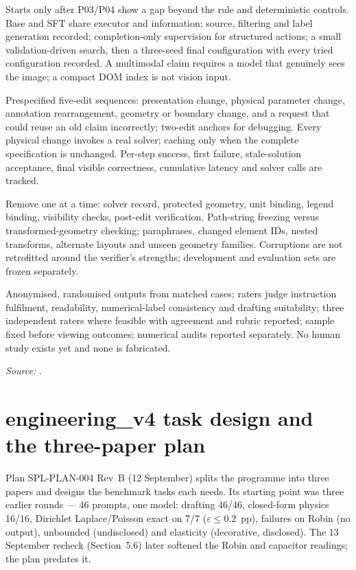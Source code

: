 \documentclass[11pt,a4paper]{article}
\newcommand{\code}[1]{\path{#1}}
\begin{document}
\begin{description}[style=nextline]
  \item[P05 training study.] Starts only after P03/P04 show a gap beyond the rule and deterministic controls. Base and SFT share executor and information; source, filtering and label generation recorded; completion-only supervision for structured actions; a small validation-driven search, then a three-seed final configuration with every tried configuration recorded. A multimodal claim requires a model that genuinely sees the image; a compact DOM index is not vision input.
  \item[P06 sequential edits.] Prespecified five-edit sequences: presentation change, physical parameter change, annotation rearrangement, geometry or boundary change, and a request that could reuse an old claim incorrectly; two-edit anchors for debugging. Every physical change invokes a real solver; caching only when the complete specification is unchanged. Per-step success, first failure, stale-solution acceptance, final visible correctness, cumulative latency and solver calls are tracked.
  \item[P07 ablations.] Remove one at a time: solver record, protected geometry, unit binding, legend binding, visibility checks, post-edit verification. Path-string freezing versus transformed-geometry checking; paraphrases, changed element IDs, nested transforms, alternate layouts and unseen geometry families. Corruptions are not retrofitted around the verifier's strengths; development and evaluation sets are frozen separately.
  \item[P08 human assessment.] Anonymised, randomised outputs from matched cases; raters judge instruction fulfilment, readability, numerical-label consistency and drafting suitability; three independent raters where feasible with agreement and rubric reported; sample fixed before viewing outcomes; numerical audits reported separately. No human study exists yet and none is fabricated.
\end{description}

\emph{Source:} \code{docs/source/experiment_protocol.md}.

\section{engineering\_v4 task design and the three-paper plan}

Plan SPL-PLAN-004 Rev~B (12 September) splits the programme into three papers and designs the benchmark tasks each needs. Its starting point was three earlier rounds --- 46 prompts, one model: drafting 46/46, closed-form physics 16/16, Dirichlet Laplace/Poisson exact on 7/7 ($\varepsilon \le 0.2$~pp), failures on Robin (no output), unbounded (undisclosed) and elasticity (decorative, disclosed). The 13 September recheck (Section~5.6) later softened the Robin and capacitor readings; the plan predates it.
\end{document}
